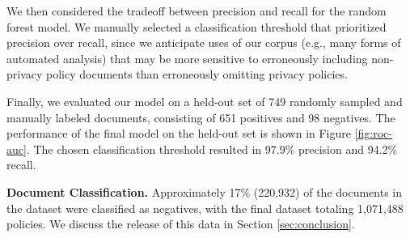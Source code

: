 We then considered the tradeoff between precision and recall for the random forest model. We manually selected a classification threshold that prioritized precision over recall, since we anticipate uses of our corpus (e.g., many forms of automated analysis) that may be more sensitive to erroneously including non-privacy policy documents than erroneously omitting privacy policies.

Finally, we evaluated our model on a held-out set of 749 randomly sampled and manually labeled documents, consisting of 651 positives and 98 negatives. The performance of the final model on the held-out set is shown in Figure \ref{fig:roc-auc}. The chosen classification threshold resulted in 97.9\% precision and 94.2\% recall.

\textbf{Document Classification.}
Approximately 17\% (220,932) of the documents in the dataset were classified as negatives, with the final dataset totaling 1,071,488 policies. We discuss the release of this data in Section \ref{sec:conclusion}.


